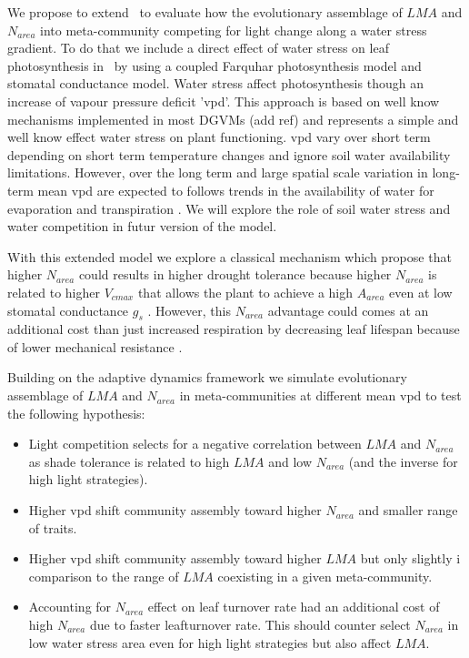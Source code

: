 \documentclass[a4paper,11pt]{article}
\begin{document}
We propose to extend \plant\ to evaluate how the evolutionary assemblage of $LMA$ and $N_{area}$ into meta-community competing for light change along a water stress gradient. To do that we include a direct effect of water stress on leaf photosynthesis in \plant\ by using a coupled Farquhar photosynthesis model and stomatal conductance model. Water stress affect photosynthesis though an increase of vapour pressure deficit 'vpd'. This approach
is based on well know mechanisms implemented in most DGVMs (add ref) and represents a simple and well know effect water stress on plant functioning. vpd vary over short term depending on short term temperature changes and ignore soil water availability limitations. However, over the long term and large spatial scale variation in long-term mean vpd are expected to follows trends in the availability of water for evaporation and transpiration \citep{Prentice-2014}. We will explore the role of soil water stress and water competition in futur version of the model.

With this extended model we explore a classical mechanism which propose that higher $N_{area}$ could results in higher drought tolerance because higher $N_{area}$ is related to higher $V_{cmax}$ that allows the
plant to achieve a high $A_{area}$ even at low stomatal conductance
$g_s$ \citep{Wright-2003}. However, this $N_{area}$ advantage could comes at an additional cost than just increased respiration by decreasing leaf lifespan because of lower mechanical resistance \citep{Wright-2002a}.

Building on the adaptive dynamics framework we simulate evolutionary assemblage of $LMA$ and $N_{area}$ in meta-communities at different mean vpd to test the following hypothesis:  
 
\begin{itemize}

\item Light competition selects for a negative correlation between $LMA$ and $N_{area}$ as shade tolerance is related to high $LMA$ and low $N_{area}$ (and the inverse for high light strategies).

\item Higher vpd shift community assembly toward higher $N_{area}$ and smaller range of traits.

\item Higher vpd shift community assembly toward higher $LMA$ but only slightly i comparison to the range of $LMA$ coexisting in a given meta-community.

\item Accounting for $N_{area}$ effect on leaf turnover rate had an additional cost of high $N_{area}$ due to faster leafturnover rate. This should counter select $N_{area}$ in low water stress area even for high light strategies but also affect $LMA$.

\end{itemize}
\end{document}
